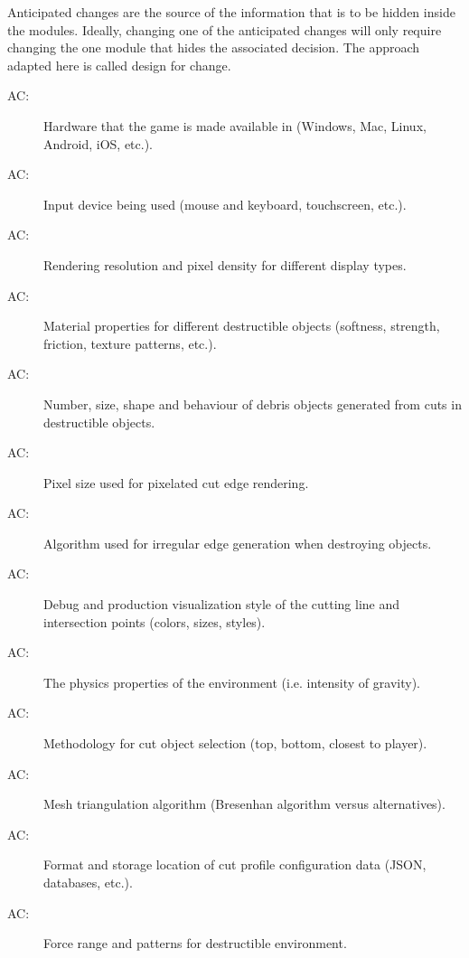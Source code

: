 \documentclass[12pt, titlepage]{article}
\newcounter{acnum}
\newcommand{\actheacnum}{AC\theacnum}
\begin{document}
Anticipated changes are the source of the information that is to be hidden
inside the modules. Ideally, changing one of the anticipated changes will only
require changing the one module that hides the associated decision. The approach
adapted here is called design for
change.

\begin{description}
\item[ \actheacnum\label{AC1}:] Hardware that the game is made available in (Windows, Mac, Linux, Android, iOS, etc.).
\item[ \actheacnum\label{AC2}:] Input device being used (mouse and keyboard, touchscreen, etc.).
\item[ \actheacnum\label{AC3}:] Rendering resolution and pixel density for different display types.
\item[ \actheacnum\label{AC4}:] Material properties for different destructible objects (softness, strength, friction, texture patterns, etc.).
\item[ \actheacnum\label{AC5}:] Number, size, shape and behaviour of debris objects generated from cuts in destructible objects.
\item[ \actheacnum\label{AC6}:] Pixel size used for pixelated cut edge rendering.
\item[ \actheacnum\label{AC7}:] Algorithm used for irregular edge generation when destroying objects.
\item[ \actheacnum\label{AC8}:] Debug and production visualization style of the cutting line and intersection points (colors, sizes, styles).
\item[ \actheacnum\label{AC9}:] The physics properties of the environment (i.e. intensity of gravity).
\item[ \actheacnum\label{AC10}:] Methodology for cut object selection (top, bottom, closest to player).
\item[ \actheacnum\label{AC11}:] Mesh triangulation algorithm (Bresenhan algorithm versus alternatives).
\item[ \actheacnum\label{AC12}:] Format and storage location of cut profile configuration data (JSON, databases, etc.).
\item[ \actheacnum\label{AC13}:] Force range and patterns for destructible environment.

\end{description}
\end{document}
